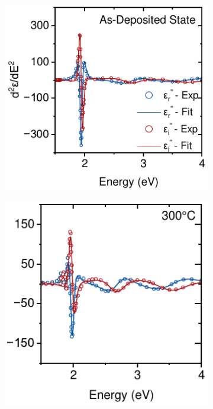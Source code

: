 \begin{figure}[htbp]
    \centering
    \begin{subfigure}{0.34\textwidth}
        \includegraphics[width=\textwidth]{chapters/ellipsometry/image/Deriv_As_Dep.pdf}
        \caption{}
        \label{fig:ellipsometry:deriv:As_dep}
    \end{subfigure}
    \hfill
    \begin{subfigure}{0.31\textwidth}
        \includegraphics[width=\textwidth]{chapters/ellipsometry/image/Deriv_300C.pdf}

\end{subfigure}
\end{figure}

